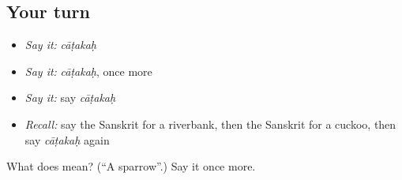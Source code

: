 \subsection*{Your turn}
\begin{itemize}
\raggedright
  \item \emph{Say it:} \emph{cāṭakaḥ}
  \item \emph{Say it:} \emph{cāṭakaḥ}, once more
  \item \emph{Say it:} say \emph{cāṭakaḥ}
  \item \emph{Recall:} say the Sanskrit for a riverbank, then the Sanskrit for a cuckoo, then say \emph{cāṭakaḥ} again
\end{itemize}

\begin{tcolorbox}[breakable,colback=teal!4,colframe=teal!35!black,title={Before you move on}]
What does  mean? (\textquotedblleft{}A sparrow\textquotedblright{}.) Say it once more.
\end{tcolorbox}
